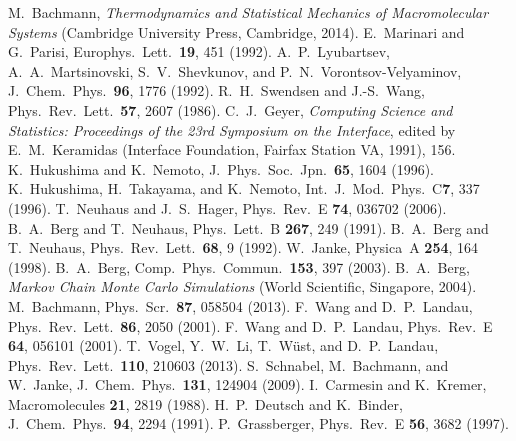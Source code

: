 %
%
M.~Bachmann, \emph{Thermodynamics and Statistical Mechanics of
Macromolecular Systems}  (Cambridge University Press, Cambridge,
2014).
%
E.~Marinari and G.~Parisi, Europhys.\ Lett.\ \textbf{19}, 451 (1992).
%
A.~P.\ Lyubartsev, A.~A.\ Martsinovski, S.~V.\ Shevkunov, and
P.~N.\ Vorontsov-Velyaminov, J.~Chem.\ Phys.\ \textbf{96}, 1776 (1992).
%
R.~H.\ Swendsen and J.-S.\ Wang, Phys.\ Rev.\ Lett.\
\textbf{57}, 2607 (1986).
%
C.~J.\ Geyer, \emph{Computing Science and Statistics: Proceedings
of the 23rd Symposium on the Interface}, edited  by E.~M.\ Keramidas
(Interface Foundation, Fairfax Station VA, 1991), 156.
%  
K.~Hukushima and K.~Nemoto, J.~Phys.\ Soc.\ Jpn.\ \textbf{65},
1604 (1996).
% 
K.~Hukushima, H.~Takayama, and K.~Nemoto, Int.~J.\ Mod.\ Phys.~C\textbf{7},
337 (1996).
%
%
T.~Neuhaus and J.~S.\ Hager, Phys.\ Rev.~E \textbf{74}, 036702 (2006).
%
B.~A.\ Berg and T.~Neuhaus, Phys.\ Lett.~B \textbf{267}, 249 (1991).
%
B.~A.\ Berg and T.~Neuhaus, Phys.\ Rev.\ Lett.\ \textbf{68}, 9 (1992).
%
W.~Janke, Physica~A \textbf{254}, 164 (1998).
%
B.~A.\ Berg, Comp.\ Phys.\ Commun.\ \textbf{153}, 397 (2003).
% 
B.~A.\ Berg, \textit{Markov Chain Monte Carlo Simulations}
(World Scientific, Singapore, 2004).
%
M.~Bachmann, Phys.\ Scr.\ \textbf{87}, 058504 (2013).
%
F.~Wang and D.~P.\ Landau, Phys.\ Rev.\ Lett.\ \textbf{86}, 2050 (2001).
%
F.~Wang and D.~P.\ Landau, Phys.\ Rev.~E \textbf{64}, 056101 (2001).
%
T.~Vogel, Y.~W.\ Li, T.~W\"ust, and D.~P.\ Landau, Phys.\ Rev.\ Lett.\
\textbf{110}, 210603 (2013).
%
%
S.~Schnabel, M.~Bachmann, and W.~Janke, J.~Chem.\ Phys.\ \textbf{131},
124904 (2009).
%
I.~Carmesin and K.~Kremer, Macromolecules \textbf{21}, 2819 (1988).
% 
\bibitem{bf2}
H.~P.~Deutsch and K.~Binder, J.~Chem.\ Phys.\ \textbf{94}, 2294 (1991).
%
\bibitem{grass2}
P.~Grassberger, Phys.\ Rev.~E \textbf{56}, 3682 (1997).
%
